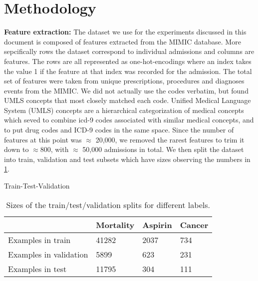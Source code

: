 \section{Methodology}

\textbf{Feature extraction:}
The dataset we use for the experiments discussed in this document is composed of features extracted from the MIMIC database.
More sepcifically rows the dataset correspond to individual admissions and columns are features.
The rows are all represented as one-hot-encodings where an index takes the value 1 if the feature at that index was recorded for the admission.
The total set of features were taken from  unique prescriptions, procedures and diagnoses events from the MIMIC.
We did not actually use the codes verbatim, but found UMLS concepts that most closely matched each code. Unified Medical Language System (UMLS)
concepts are a hierarchical categorization of medical concepts which seved to combine icd-9 codes associated with similar medical concepts, and to 
put drug codes and ICD-9 codes in the same space. Since the number of features at this point was $\approx$ 20,000, we removed the rarest features to 
trim it down to $\approx 800$, with $\approx$ 50,000 admissions in total. We then split the dataset into train, validation and test subsets which have 
sizes observing the numbers in \ref{table:splits}.


\begin{table}[h!]
\centering
\caption{Train-Test-Validation}
\label{table:splits}
\begin{tabular}{|l|l|l|l|}
\hline
               & Mortality & Aspirin & Cancer \\ \hline
Examples in train      & 41282     & 2037    & 734    \\ \hline
Examples in validation & 5899      & 623     & 231    \\ \hline
Examples in test       & 11795     & 304     & 111       \\ \hline
\end{tabular}
\caption*{Sizes of the train/test/validation splits for different labels.}
\end{table}